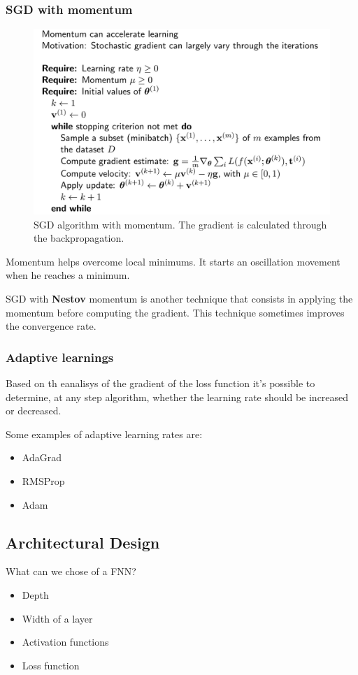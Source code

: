 \subsubsection{SGD with momentum}
\begin{figure}[H]
    \centering
    \includegraphics[width=15cm]{images/FNN/SGD_momentum.png}
    \caption{SGD algorithm with momentum. The gradient is calculated through the backpropagation.}
    \label{fig:sgd_momentum}
\end{figure}
Momentum helps overcome local minimums. It starts an oscillation movement when he reaches a minimum.

SGD with \textbf{Nestov} momentum is another technique that consists in applying the momentum before computing the gradient. This technique sometimes improves the convergence rate.

\subsubsection{Adaptive learnings}
Based on th eanalisys of the gradient of the loss function it's possible to determine, at any step algorithm, whether the learning rate should be increased or decreased.

Some examples of adaptive learning rates are:
\begin{itemize}
    \item AdaGrad
    \item RMSProp
    \item Adam
\end{itemize}


\subsection{Architectural Design}
What can we chose of a FNN?
\begin{itemize}
    \item Depth
    \item Width of a layer
    \item Activation functions
    \item Loss function
\end{itemize}

